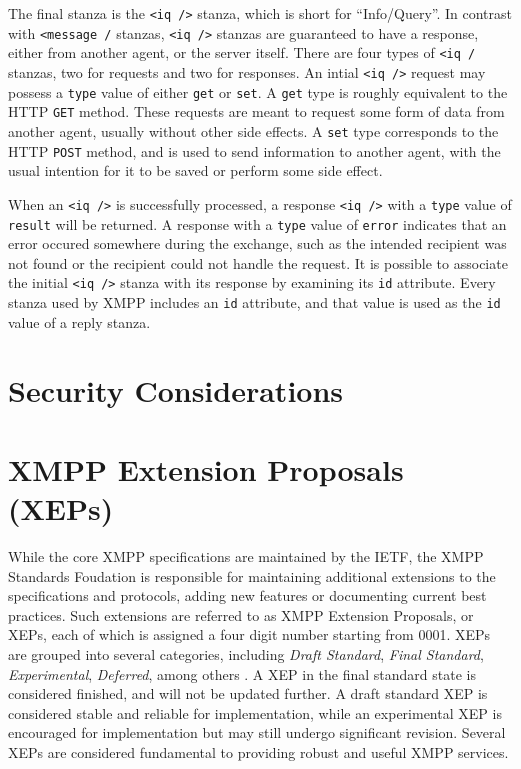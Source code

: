 The final stanza is the \texttt{<iq />} stanza, which is short for
``Info/Query''. In contrast with \texttt{<message /} stanzas, \texttt{<iq
/>} stanzas are guaranteed to have a response, either from another agent, or
the server itself. There are four types of \texttt{<iq /} stanzas, two for
requests and two for responses. An intial \texttt{<iq />} request may possess a
\texttt{type} value of either \texttt{get} or \texttt{set}. A \texttt{get} type
is roughly equivalent to the HTTP \texttt{GET} method. These requests are meant
to request some form of data from another agent, usually without other side
effects. A \texttt{set} type corresponds to the HTTP \texttt{POST} method, and
is used to send information to another agent, with the usual intention for it to
be saved or perform some side effect.

When an \texttt{<iq />} is successfully processed, a response \texttt{<iq />}
with a \texttt{type} value of \texttt{result} will be returned. A response
with a \texttt{type} value of \texttt{error} indicates that an error occured
somewhere during the exchange, such as the intended recipient was not found or
the recipient could not handle the request. It is possible to associate the
initial \texttt{<iq />} stanza with its response by examining its \texttt{id}
attribute. Every stanza used by XMPP includes an \texttt{id} attribute, and that
value is used as the \texttt{id} value of a reply stanza.

\section{Security Considerations}
\label{sec:Security-Considerations}

\section{XMPP Extension Proposals (XEPs)}
\label{sec:XEPs}

While the core XMPP specifications are maintained by the IETF, the XMPP
Standards Foudation is responsible for maintaining additional extensions to
the specifications and protocols, adding new features or documenting current
best practices. Such extensions are referred to as XMPP Extension Proposals,
or XEPs, each of which is assigned a four digit number starting from 0001.
XEPs are grouped into several categories, including \textit{Draft Standard},
\textit{Final Standard}, \textit{Experimental}, \textit{Deferred}, among
others \cite{XMPP-XEP-States}. A XEP in the final standard state is considered
finished, and will not be updated further. A draft standard XEP is considered
stable and reliable for implementation, while an experimental XEP is encouraged
for implementation but may still undergo significant revision. Several XEPs are
considered fundamental to providing robust and useful XMPP services.

